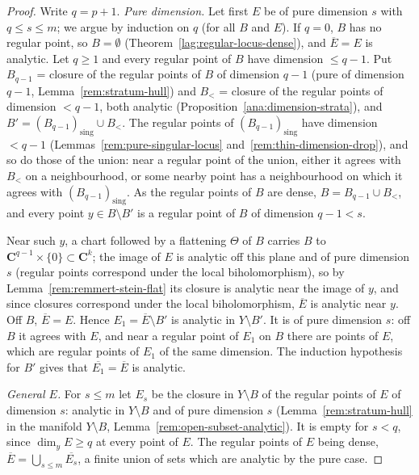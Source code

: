 \begin{proof}
\leanok
Write \(q=p+1\). \emph{Pure dimension.} Let first \(E\) be of pure dimension \(s\) with \(q\le s\le m\); we argue by induction on \(q\) (for all \(B\) and \(E\)).
If \(q=0\), \(B\) has no regular point, so \(B=\emptyset\) (Theorem~\ref{lag:regular-locus-dense}), and \(\overline E=E\) is analytic. Let \(q\ge1\) and
every regular point of \(B\) have dimension \(\le q-1\). Put \(B_{q-1}\) = closure of the regular points of \(B\) of dimension \(q-1\) (pure of dimension
\(q-1\), Lemma~\ref{rem:stratum-hull}) and \(B_{<}\) = closure of the regular points of dimension \(<q-1\), both analytic
(Proposition~\ref{ana:dimension-strata}), and \(B'=(B_{q-1})_{\mathrm{sing}}\cup B_{<}\). The regular points of \((B_{q-1})_{\mathrm{sing}}\) have dimension
\(<q-1\) (Lemmas~\ref{rem:pure-singular-locus} and~\ref{rem:thin-dimension-drop}), and so do those of the union: near a regular point of the union, either
it agrees with \(B_{<}\) on a neighbourhood, or some nearby point has a neighbourhood on which it agrees with \((B_{q-1})_{\mathrm{sing}}\). As the regular
points of \(B\) are dense, \(B=B_{q-1}\cup B_{<}\), and every point \(y\in B\setminus B'\) is a regular point of \(B\) of dimension \(q-1<s\).

Near such \(y\), a chart followed by a flattening \(\Theta\) of \(B\) carries \(B\) to \(\mathbf C^{q-1}\times\{0\}\subset\mathbf C^k\); the image of \(E\) is
analytic off this plane and of pure dimension \(s\) (regular points correspond under the local biholomorphism), so by
Lemma~\ref{rem:remmert-stein-flat} its closure is analytic near the image of \(y\), and since closures correspond under the local biholomorphism,
\(\overline E\) is analytic near \(y\). Off \(B\), \(\overline E=E\). Hence \(E_1=\overline E\setminus B'\) is analytic in \(Y\setminus B'\). It is of pure dimension
\(s\): off \(B\) it agrees with \(E\), and near a regular point of \(E_1\) on \(B\) there are points of \(E\), which are regular points of \(E_1\) of the same
dimension. The induction hypothesis for \(B'\) gives that \(\overline{E_1}=\overline E\) is analytic.

\emph{General \(E\).} For \(s\le m\) let \(E_s\) be the closure in \(Y\setminus B\) of the regular points of \(E\) of dimension \(s\): analytic in \(Y\setminus B\) and of
pure dimension \(s\) (Lemma~\ref{rem:stratum-hull} in the manifold \(Y\setminus B\), Lemma~\ref{rem:open-subset-analytic}). It is empty for \(s<q\), since
\(\dim_yE\ge q\) at every point of \(E\). The regular points of \(E\) being dense, \(\overline E=\bigcup_{s\le m}\overline{E_s}\), a finite union of sets which are
analytic by the pure case.
\end{proof}

